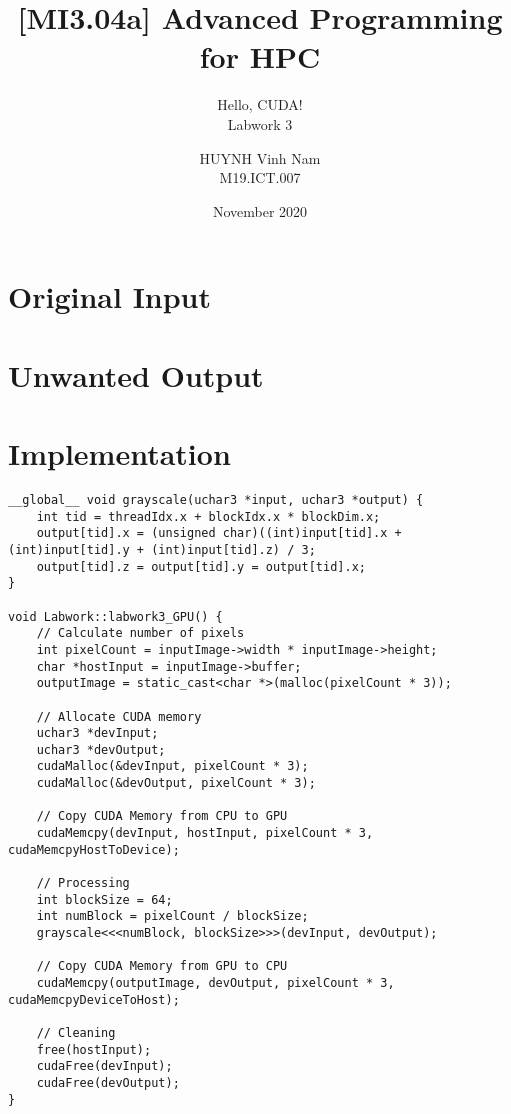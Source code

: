 \documentclass[10pt, a4paper]{article}
\title{[MI3.04a] Advanced Programming for HPC}
\subtitle{Hello, CUDA! \\ Labwork 3}
\author{HUYNH Vinh Nam \\ M19.ICT.007}
\date{November 2020}
\begin{document}
\maketitle


\section*{Original Input}
    \begin{center}
        \begin{figure}[H]
            \centering
            \label{fig:cuda-input}
        \end{figure}
    \end{center}
    
\section*{Unwanted Output}
    \begin{center}
        \begin{figure}[H]
            \centering
            \label{fig:cuda-uw-out}
        \end{figure}
    \end{center}

\hfill
\section*{Implementation}

\begin{verbatim}
__global__ void grayscale(uchar3 *input, uchar3 *output) {
    int tid = threadIdx.x + blockIdx.x * blockDim.x;
    output[tid].x = (unsigned char)((int)input[tid].x + (int)input[tid].y + (int)input[tid].z) / 3;
    output[tid].z = output[tid].y = output[tid].x;
}

void Labwork::labwork3_GPU() {
    // Calculate number of pixels
    int pixelCount = inputImage->width * inputImage->height;
    char *hostInput = inputImage->buffer;
    outputImage = static_cast<char *>(malloc(pixelCount * 3));

    // Allocate CUDA memory    
    uchar3 *devInput;
    uchar3 *devOutput;
    cudaMalloc(&devInput, pixelCount * 3);
    cudaMalloc(&devOutput, pixelCount * 3);
    
    // Copy CUDA Memory from CPU to GPU
    cudaMemcpy(devInput, hostInput, pixelCount * 3, cudaMemcpyHostToDevice);

    // Processing
    int blockSize = 64;
    int numBlock = pixelCount / blockSize;
    grayscale<<<numBlock, blockSize>>>(devInput, devOutput);

    // Copy CUDA Memory from GPU to CPU
    cudaMemcpy(outputImage, devOutput, pixelCount * 3, cudaMemcpyDeviceToHost);

    // Cleaning
    free(hostInput);
    cudaFree(devInput);
    cudaFree(devOutput);
}

\end{verbatim}
\end{document}
